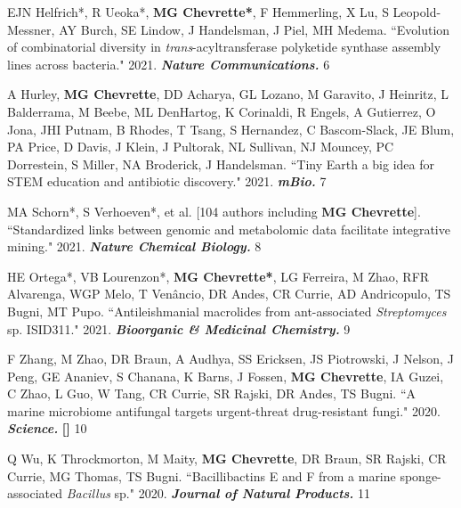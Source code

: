 \begin{cvpubs}
\cvpub
{EJN Helfrich*, R Ueoka*, \textbf{MG Chevrette*}, F Hemmerling, X Lu, S Leopold-Messner, AY Burch, SE Lindow, J Handelsman, J Piel, MH Medema. ``Evolution of combinatorial diversity in \textit{trans}-acyltransferase polyketide synthase assembly lines across bacteria." 2021. \textit{\textbf{Nature Communications.}} \textit{\textbf{}}}
{6}

\cvpub
{A Hurley, \textbf{MG Chevrette}, DD Acharya, GL Lozano, M Garavito, J Heinritz, L Balderrama, M Beebe, ML DenHartog, K Corinaldi, R Engels, A Gutierrez, O Jona, JHI Putnam, B Rhodes, T Tsang, S Hernandez, C Bascom-Slack, JE Blum, PA Price, D Davis, J Klein, J Pultorak, NL Sullivan, NJ Mouncey, PC Dorrestein, S Miller, NA Broderick, J Handelsman. ``Tiny Earth\: a big idea for STEM education and antibiotic discovery." 2021. \textit{\textbf{mBio.}} \textit{\textbf{}}}
{7}

\cvpub
{MA Schorn*, S Verhoeven*, et al. [104 authors including \textbf{MG Chevrette}]. ``Standardized links between genomic and metabolomic data facilitate integrative mining." 2021. \textit{\textbf{Nature Chemical Biology.}} \textit{\textbf{}}}
{8}

\cvpub
{HE Ortega*, VB Lourenzon*, \textbf{MG Chevrette*}, LG Ferreira, M Zhao, RFR Alvarenga, WGP Melo, T Venâncio, DR Andes, CR Currie, AD Andricopulo, TS Bugni, MT Pupo. ``Antileishmanial macrolides from ant-associated \textit{Streptomyces} sp. ISID311." 2021. \textit{\textbf{Bioorganic \& Medicinal Chemistry.}} \textbf{\textit{}}}
{9}

\cvpub
{F Zhang, M Zhao, DR Braun, A Audhya, SS Ericksen, JS Piotrowski, J Nelson, J Peng, GE Ananiev, S Chanana, K Barns, J Fossen, \textbf{MG Chevrette}, IA Guzei, C Zhao, L Guo, W Tang, CR Currie, SR Rajski, DR Andes, TS Bugni. ``A marine microbiome antifungal targets urgent-threat drug-resistant fungi." 2020. \textit{\textbf{Science.}} \textbf{\textit{}} \linebreak
\textbf{[\textit{}]}}
{10}

\cvpub
{Q Wu, K Throckmorton, M Maity, \textbf{MG Chevrette}, DR Braun, SR Rajski, CR Currie, MG Thomas, TS Bugni. ``Bacillibactins E and F from a marine sponge-associated \textit{Bacillus} sp." 2020. \textbf{\textit{Journal of Natural Products.}} \textbf{\textit{}}}
{11}


\end{cvpubs}
